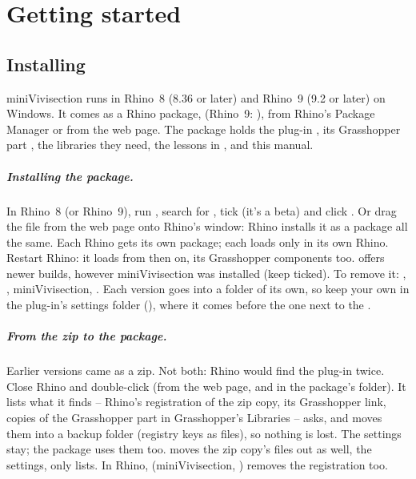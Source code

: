 \chapter{Getting started}\label{ch:start}

\section{Installing}\label{sec:install}

miniVivisection runs in Rhino~8 (8.36 or later) and Rhino~9 (9.2 or later) on Windows. It comes as a Rhino package,
 (Rhino~9: ), from Rhino's Package Manager or from the web page.
The package holds the plug-in , its Grasshopper
part , the libraries they need, the lessons in , and this
manual.

\paragraph{Installing the package.} In Rhino~8 (or Rhino~9), run , search for
, tick  (it's a beta) and click . Or drag the
 file from the web page onto Rhino's window: Rhino installs it as a package all the same. Each Rhino gets its own package; each loads only in its own Rhino.
Restart Rhino: it loads from then on, its Grasshopper components too.  offers
newer builds, however miniVivisection was installed (keep  ticked). To remove
it: , , miniVivisection, . Each version
goes into a folder of its own, so keep your own  in the plug-in's settings
folder (), where it comes before the one next to the .

\paragraph{From the zip to the package.} Earlier versions came as a zip. Not both: Rhino would find
the plug-in twice. Close Rhino and double-click  (from
the web page, and in the package's  folder). It lists what it finds -- Rhino's registration of the zip copy, its Grasshopper
link, copies of the Grasshopper part in Grasshopper's Libraries -- asks, and moves them into a backup
folder (registry keys as  files), so nothing is lost. The settings stay; the package uses
them too.  moves the zip copy's files out as well,  the
settings,  only lists. In Rhino,  (miniVivisection,
) removes the registration too.

